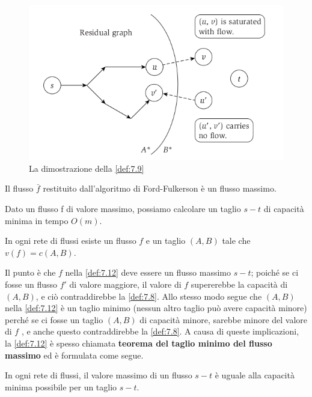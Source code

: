 \begin{figure}[H]
	\centering
	\includegraphics[width = 10 cm]{capitoli/network_flow/imgs/flow4.png}
	\caption{La dimostrazione della \ref{def:7.9}}
\end{figure}

\begin{myblockquote}
	\begin{minipage}{\textwidth}
		\begin{definition}\label{def:7.10}
			Il flusso $\bar{f}$ restituito dall'algoritmo di Ford-Fulkerson è un
			flusso massimo.
		\end{definition}
	\end{minipage}
\end{myblockquote}
\begin{myblockquote}
	\begin{minipage}{\textwidth}
		\begin{definition}\label{def:7.11}
			Dato un flusso f di valore massimo, possiamo calcolare un taglio $s-t$
			di capacità minima in tempo $O(m)$.
		\end{definition}
	\end{minipage}
\end{myblockquote}
\begin{myblockquote}
	\begin{minipage}{\textwidth}
		\begin{definition}\label{def:7.12}
			In ogni rete di flussi esiste un flusso $f$ e un taglio $(A, B)$
			tale che $v(f) = c(A, B)$.
		\end{definition}
	\end{minipage}
\end{myblockquote}

Il punto è che $f$ nella \ref{def:7.12} deve essere un flusso massimo $s-t$;
poiché se ci fosse un flusso $f'$ di valore maggiore, il valore di
$f$ supererebbe la capacità di $(A, B)$, e ciò contraddirebbe la
\ref{def:7.8}. Allo stesso modo segue che $(A, B)$ nella \ref{def:7.12} è un taglio
minimo (nessun altro taglio può avere capacità minore) perché se ci
fosse un taglio $(A , B)$ di capacità minore, sarebbe minore del
valore di $f$ , e anche questo contraddirebbe la \ref{def:7.8}. A causa di
queste implicazioni, la \ref{def:7.12} è spesso chiamata \textbf{teorema del
	taglio minimo del flusso massimo} ed è formulata come segue.

\begin{myblockquote}
	\begin{minipage}{\textwidth}
		\begin{theorem}
			In ogni rete di flussi, il valore massimo di un flusso $s-t$ è
			uguale alla capacità minima possibile per un taglio $s-t$.
		\end{theorem}
	\end{minipage}
\end{myblockquote}
